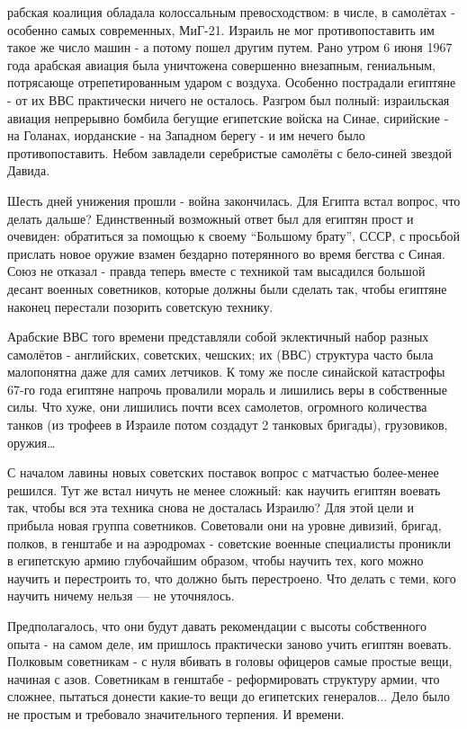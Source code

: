 рабская коалиция обладала колоссальным превосходством: в числе, в самолётах - особенно самых современных, МиГ-21. Израиль не мог противопоставить им такое же число машин - а потому пошел другим путем. Рано утром 6 июня 1967 года арабская авиация была уничтожена совершенно внезапным, гениальным, потрясающе отрепетированным ударом с воздуха. Особенно пострадали египтяне - от их ВВС практически ничего не осталось. Разгром был полный: израильская авиация непрерывно бомбила бегущие египетские войска на Синае, сирийские - на Голанах, иорданские - на Западном берегу - и им нечего было противопоставить. Небом завладели серебристые самолёты с бело-синей звездой Давида.

Шесть дней унижения прошли - война закончилась. Для Египта встал вопрос, что делать дальше? Единственный возможный ответ был для египтян прост и очевиден: обратиться за помощью к своему “Большому брату”, СССР, с просьбой прислать новое оружие взамен бездарно потерянного во время бегства с Синая. Союз не отказал - правда теперь вместе с техникой там высадился большой десант военных советников, которые должны были сделать так, чтобы египтяне наконец перестали позорить советскую технику.

Арабские ВВС того времени представляли собой эклектичный набор разных самолётов - английских, советских, чешских; их (ВВС) структура часто была малопонятна даже для самих летчиков. К тому же после синайской катастрофы 67-го года египтяне напрочь провалили мораль и лишились веры в собственные силы. Что хуже, они лишились почти всех самолетов, огромного количества танков (из трофеев в Израиле потом создадут 2 танковых бригады), грузовиков, оружия…

С началом лавины новых советских поставок вопрос с матчастью более-менее решился. Тут же встал ничуть не менее сложный: как научить египтян воевать так, чтобы вся эта техника снова не досталась Израилю? Для этой цели и прибыла новая группа советников. Советовали они на уровне дивизий, бригад, полков, в генштабе и на аэродромах - советские военные специалисты проникли в египетскую армию глубочайшим образом, чтобы научить тех, кого можно научить и перестроить то, что должно быть перестроено. Что делать с теми, кого научить ничему нельзя — не уточнялось.

Предполагалось, что они будут давать рекомендации с высоты собственного опыта - на самом деле, им пришлось практически заново учить египтян воевать. Полковым советникам - с нуля вбивать в головы офицеров самые простые вещи, начиная с азов. Советникам в генштабе - реформировать структуру армии, что сложнее, пытаться донести какие-то вещи до египетских генералов... Дело было не простым и требовало значительного терпения. И времени.


